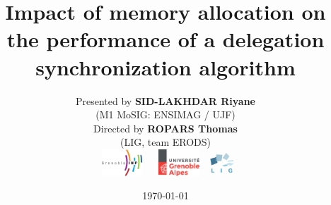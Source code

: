 \documentclass[xcolor=x11names,compress]{beamer}
\renewcommand{\(}{\begin{columns}}
\renewcommand{\)}{\end{columns}}
\newcommand{\<}[1]{\begin{column}{#1}}
\renewcommand{\>}{\end{column}}
\begin{document}

\begin{frame}
\title{Impact of memory allocation on the performance of a delegation synchronization algorithm}
\author
{
	Presented by \textbf{SID-LAKHDAR Riyane}\\
	(M1 MoSIG: ENSIMAG / UJF)\\
	Directed by \textbf{ROPARS Thomas}\\
    (LIG, team ERODS)\\
	\includegraphics[height=1cm,width=2cm]{logo/logoINP.png}
	\includegraphics[height=1cm,width=2cm]{logo/logoUJF.jpg}
	\includegraphics[height=1cm,width=1cm]{logo/logoLIG.jpg}
}
\date
{
	\vspace{1cm}
	\today
}
\titlepage
\end{frame}
\end{document}
